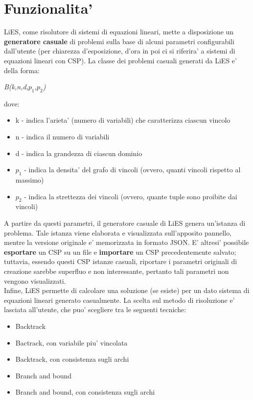 \documentclass{article}
\begin{document}
\section{Funzionalita'}
\label{sec:funzionalita}

LiES, come risolutore di sistemi di equazioni lineari, mette a disposizione un \textbf{generatore casuale} di problemi sulla base di alcuni parametri configurabili dall'utente (per chiarezza d'esposizione, d'ora in poi ci si riferira' a sistemi di equazioni lineari con CSP). La classe dei problemi casuali generati da LiES e' della forma:
\begin{center}
	\textit{B(k,n,d,$p_1$,$p_2$)}
\end{center}

dove:
\begin{itemize}
	\item k - indica l'arieta' (numero di variabili) che caratterizza ciascun vincolo
	\item n - indica il numero di variabili
	\item d - indica la grandezza di ciascun dominio
	\item $p_1$ - indica la densita' del grafo di vincoli (ovvero, quanti vincoli rispetto al massimo)
	\item $p_2$ - indica la strettezza dei vincoli (ovvero,	quante tuple sono proibite dai vincoli) 
\end{itemize}

A partire da questi parametri, il generatore casuale di LiES genera un'istanza di problema. Tale istanza viene elaborata e visualizzata sull'apposito pannello, mentre la versione originale e' memorizzata in formato JSON. E' altresi' possibile \textbf{esportare} un CSP su un file e \textbf{importare} un CSP precedentemente salvato; tuttavia, essendo questi CSP istanze casuali, riportare i parametri originali di creazione sarebbe superfluo e non interessante, pertanto tali parametri non vengono visualizzati.\\

Infine, LiES permette di calcolare una soluzione (se esiste) per un dato sistema di equazioni lineari generato casualmente. La scelta sul metodo di risoluzione e' lasciata all'utente, che puo' scegliere tra le seguenti tecniche:
\begin{itemize}
	\item Backtrack
	\item Bactrack, con variabile piu' vincolata
	\item Backtrack, con consistenza sugli archi
	\item Branch and bound
	\item Branch and bound, con consistenza sugli archi
\end{itemize}
\end{document}
